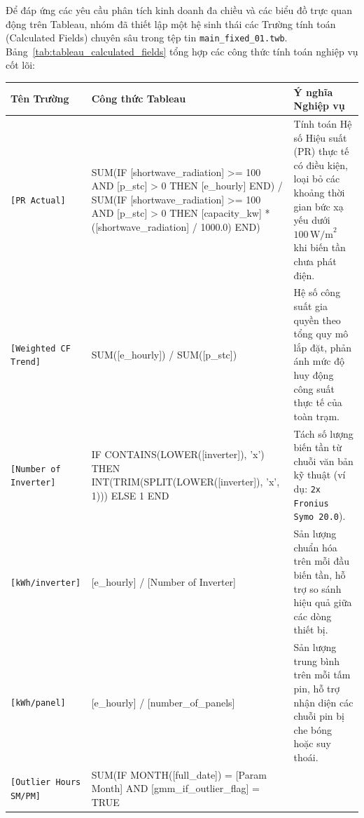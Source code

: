 \documentclass[12pt, a4paper]{report}
\begin{document}
Để đáp ứng các yêu cầu phân tích kinh doanh đa chiều và các biểu đồ trực quan động trên Tableau, nhóm đã thiết lập một hệ sinh thái các Trường tính toán (Calculated Fields) chuyên sâu trong tệp tin \texttt{main\_fixed\_01.twb}. Bảng~\ref{tab:tableau_calculated_fields} tổng hợp các công thức tính toán nghiệp vụ cốt lõi:

\begin{table}[H]
\centering
\small
\renewcommand{\arraystretch}{1.25}
\begin{tabularx}{\textwidth}{@{} >{\raggedright\arraybackslash}p{3.2cm} >{\raggedright\arraybackslash\ttfamily\scriptsize}p{6.0cm} >{\raggedright\arraybackslash}X @{}}
\toprule
\textbf{Tên Trường} & \textbf{Công thức Tableau} & \textbf{Ý nghĩa Nghiệp vụ} \\
\midrule
\texttt{[PR Actual]} & 
SUM(IF [shortwave\_radiation] >= 100 \newline
\quad AND [p\_stc] > 0 THEN [e\_hourly] END) \newline
/ SUM(IF [shortwave\_radiation] >= 100 \newline
\quad AND [p\_stc] > 0 \newline
\quad THEN [capacity\_kw] * ([shortwave\_radiation] / 1000.0) END) & 
Tính toán Hệ số Hiệu suất (PR) thực tế có điều kiện, loại bỏ các khoảng thời gian bức xạ yếu dưới $100\,\text{W/m}^2$ khi biến tần chưa phát điện. \\
\midrule
\texttt{[Weighted CF Trend]} & 
SUM([e\_hourly]) / SUM([p\_stc]) & 
Hệ số công suất gia quyền theo tổng quy mô lắp đặt, phản ánh mức độ huy động công suất thực tế của toàn trạm. \\
\midrule
\texttt{[Number of Inverter]} & 
IF CONTAINS(LOWER([inverter]), 'x') \newline
THEN INT(TRIM(SPLIT(LOWER([inverter]), 'x', 1))) \newline
ELSE 1 END & 
Tách số lượng biến tần từ chuỗi văn bản kỹ thuật (ví dụ: \texttt{2x Fronius Symo 20.0}). \\
\midrule
\texttt{[kWh/inverter]} & 
[e\_hourly] / [Number of Inverter] & 
Sản lượng chuẩn hóa trên mỗi đầu biến tần, hỗ trợ so sánh hiệu quả giữa các dòng thiết bị. \\
\midrule
\texttt{[kWh/panel]} & 
[e\_hourly] / [number\_of\_panels] & 
Sản lượng trung bình trên mỗi tấm pin, hỗ trợ nhận diện các chuỗi pin bị che bóng hoặc suy thoái. \\
\midrule
\texttt{[Outlier Hours SM/PM]} & 
SUM(IF MONTH([full\_date]) = [Param Month] \newline
\quad AND [gmm\_if\_outlier\_flag] = TRUE \newline

\end{tabularx}
\end{table}
\end{document}
